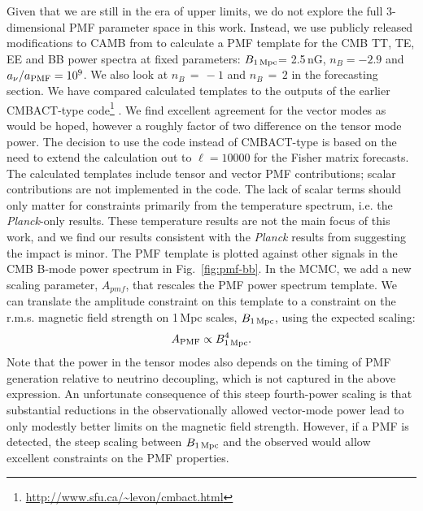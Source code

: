 \documentclass[apj]{emulateapj}
\newcommand{\apmf}{\ensuremath{A_{\rm PMF}}}
\newcommand{\bpmf}{\ensuremath{B_{\rm 1\,Mpc}}}
\newcommand{\be}{\begin{equation}}
\newcommand{\ee}{\end{equation}}
\newcommand{\planck}{{\sl Planck}}
\begin{document}
Given that we are still in the era of upper limits,  we do not explore the full 3-dimensional PMF parameter space in this work. 
Instead, we use publicly released modifications to CAMB from \citet{zucca16} to calculate a PMF template for the CMB TT, TE, EE and BB power spectra at fixed parameters: \bpmf = 2.5\,nG, $n_B = -2.9$ and $a_{\nu}/a_{\rm{PMF}} = 10^9$. 
We also look at $n_B\,=\,-1$ and $n_B\,=\,2$ in the forecasting section. 
We have compared calculated templates to the outputs of the earlier CMBACT-type code\footnote{\url{http://www.sfu.ca/~levon/cmbact.html}} \citep{pogosian99}. 
We find excellent agreement  for the vector modes as would be hoped, however a roughly factor of two difference on the tensor mode power. 
The decision to use the  \citet{zucca16} code instead of CMBACT-type is based on the need to extend the calculation out to $\ell=10000$ for the Fisher matrix forecasts. 
The calculated templates include tensor and vector PMF contributions; scalar contributions are not implemented in the code. 
The lack of scalar terms should only matter for constraints primarily from the temperature spectrum, i.e. the \planck-only results. 
These temperature results are not the main focus of this work, and we find our results consistent with the \planck{} results from \citet{planck15-19} suggesting the impact is minor. 
The PMF template is plotted against other signals in the CMB B-mode power spectrum in Fig.~\ref{fig:pmf-bb}. 
In the MCMC, we add a new scaling parameter, $A_{pmf}$, that rescales the PMF power spectrum template. 
We can translate the amplitude constraint on this template to a constraint on the r.m.s. magnetic field strength on 1\,Mpc scales, \bpmf, using the expected scaling:
\be \label{eqn:scaling}
\apmf \propto \bpmf^4.
\ee
Note that the power in the tensor modes also depends on the timing of PMF generation relative to neutrino decoupling, which is not captured in the above expression. 
An unfortunate consequence of this steep fourth-power scaling is that substantial reductions in the observationally allowed vector-mode power lead to only modestly better limits on the magnetic field strength. 
However, if a PMF is detected, the steep scaling between \bpmf{} and the observed would allow excellent constraints on the PMF properties.
\end{document}
